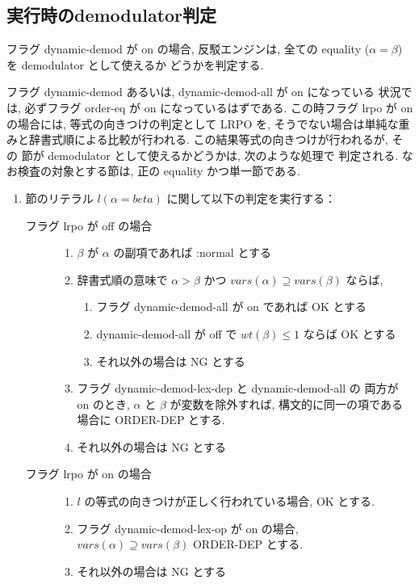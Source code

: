 \subsection{実行時のdemodulator判定}
\label{sec:dynamic-demodulator}

フラグ dynamic-demod が on の場合, 反駁エンジンは,
全ての equality ($\alpha = \beta$)を demodulator として使えるか
どうかを判定する.

フラグ dynamic-demod あるいは, dynamic-demod-all が on になっている
状況では, 必ずフラグ order-eq が on になっているはずである.
この時フラグ lrpo が on の場合には, 等式の向きつけの判定として
LRPO を,
そうでない場合は単純な重みと辞書式順による比較が行われる.
この結果等式の向きつけが行われるが, その
節が demodulator として使えるかどうかは, 次のような処理で
判定される.
なお検査の対象とする節は, 正の equality かつ単一節である.

\begin{enumerate}
\item 節のリテラル $l (\alpha = beta)$ に関して以下の判定を実行する：
  \begin{description}
  \item[フラグ lrpo が off の場合]
    \begin{enumerate}
    \item $\beta$ が $\alpha$ の副項であれば :normal とする
    \item 辞書式順の意味で 
      $\alpha > \beta$ かつ $vars(\alpha) \supseteq vars(\beta)$
      ならば,
      \begin{enumerate}
      \item フラグ dynamic-demod-all が on であれば OK とする
      \item dynamic-demod-all が off で $wt(\beta)\leq 1$ ならば
        OK とする
      \item それ以外の場合は NG とする
      \end{enumerate}
    \item フラグ dynamic-demod-lex-dep と dynamic-demod-all の
      両方が on のとき, $\alpha$ と $\beta$ が変数を除外すれば,
      構文的に同一の項である場合に ORDER-DEP とする.
    \item それ以外の場合は NG とする
    \end{enumerate}
  \item[フラグ lrpo が on の場合]
    \begin{enumerate}
    \item $l$ の等式の向きつけが正しく行われている場合, OK とする.
    \item フラグ dynamic-demod-lex-op が on の場合,
      $vars(\alpha)\supseteq vars(\beta)$ ORDER-DEP とする.
    \item それ以外の場合は NG とする
    \end{enumerate}
  \end{description}
\end{enumerate}


